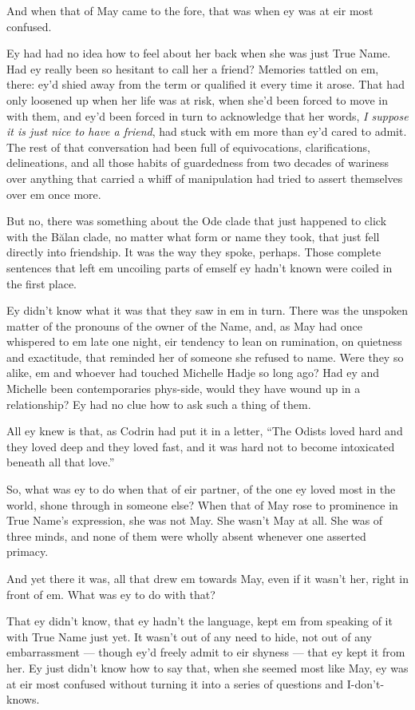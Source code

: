 And when that of May came to the fore, that was when ey was at eir most confused.

Ey had had no idea how to feel about her back when she was just True Name. Had ey really been so hesitant to call her a friend? Memories tattled on em, there: ey'd shied away from the term or qualified it every time it arose. That had only loosened up when her life was at risk, when she'd been forced to move in with them, and ey'd been forced in turn to acknowledge that her words, \emph{I suppose it is just nice to have a friend}, had stuck with em more than ey'd cared to admit. The rest of that conversation had been full of equivocations, clarifications, delineations, and all those habits of guardedness from two decades of wariness over anything that carried a whiff of manipulation had tried to assert themselves over em once more.

But no, there was something about the Ode clade that just happened to click with the Bălan clade, no matter what form or name they took, that just fell directly into friendship. It was the way they spoke, perhaps. Those complete sentences that left em uncoiling parts of emself ey hadn't known were coiled in the first place.

Ey didn't know what it was that they saw in em in turn. There was the unspoken matter of the pronouns of the owner of the Name, and, as May had once whispered to em late one night, eir tendency to lean on rumination, on quietness and exactitude, that reminded her of someone she refused to name. Were they so alike, em and whoever had touched Michelle Hadje so long ago? Had ey and Michelle been contemporaries phys-side, would they have wound up in a relationship? Ey had no clue how to ask such a thing of them.

All ey knew is that, as Codrin had put it in a letter, ``The Odists loved hard and they loved deep and they loved fast, and it was hard not to become intoxicated beneath all that love.''

So, what was ey to do when that of eir partner, of the one ey loved most in the world, shone through in someone else? When that of May rose to prominence in True Name's expression, she was not May. She wasn't May at all. She was of three minds, and none of them were wholly absent whenever one asserted primacy.

And yet there it was, all that drew em towards May, even if it wasn't her, right in front of em. What was ey to do with that?

That ey didn't know, that ey hadn't the language, kept em from speaking of it with True Name just yet. It wasn't out of any need to hide, not out of any embarrassment — though ey'd freely admit to eir shyness — that ey kept it from her. Ey just didn't know how to say that, when she seemed most like May, ey was at eir most confused without turning it into a series of questions and I-don't-knows.

